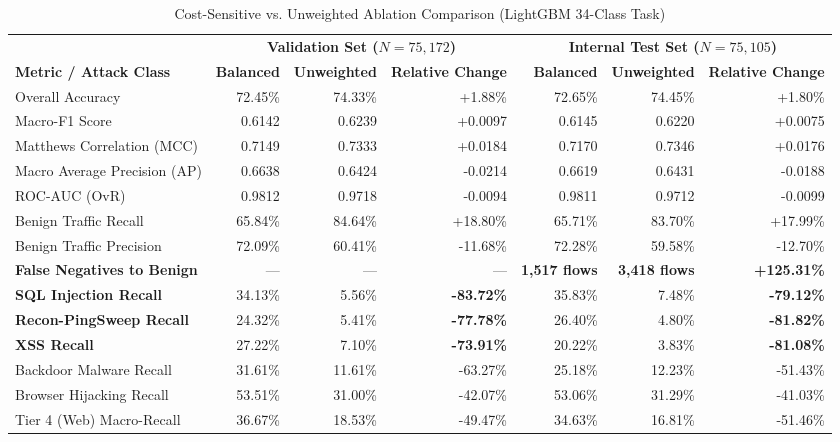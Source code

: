 \documentclass[conference,10pt,twocolumn]{IEEEtran}
\begin{document}
\begin{table}[t]
\centering
\caption{Cost-Sensitive vs. Unweighted Ablation Comparison (LightGBM 34-Class Task)}
\label{tab:cost_sensitive_ablation}
\small
\begin{tabular}{@{}lrrrrrr@{}}
\toprule
& \multicolumn{3}{c}{\textbf{Validation Set ($N = 75,172$)}} & \multicolumn{3}{c}{\textbf{Internal Test Set ($N = 75,105$)}} \\ \cmidrule(lr){2-4} \cmidrule(lr){5-7}
\textbf{Metric / Attack Class} & \textbf{Balanced} & \textbf{Unweighted} & \textbf{Relative Change} & \textbf{Balanced} & \textbf{Unweighted} & \textbf{Relative Change} \\ \midrule
Overall Accuracy & 72.45\% & 74.33\% & +1.88\% & 72.65\% & 74.45\% & +1.80\% \\
Macro-F1 Score & 0.6142 & 0.6239 & +0.0097 & 0.6145 & 0.6220 & +0.0075 \\
Matthews Correlation (MCC) & 0.7149 & 0.7333 & +0.0184 & 0.7170 & 0.7346 & +0.0176 \\
Macro Average Precision (AP) & 0.6638 & 0.6424 & -0.0214 & 0.6619 & 0.6431 & -0.0188 \\
ROC-AUC (OvR) & 0.9812 & 0.9718 & -0.0094 & 0.9811 & 0.9712 & -0.0099 \\ \midrule
Benign Traffic Recall & 65.84\% & 84.64\% & +18.80\% & 65.71\% & 83.70\% & +17.99\% \\
Benign Traffic Precision & 72.09\% & 60.41\% & -11.68\% & 72.28\% & 59.58\% & -12.70\% \\
\textbf{False Negatives to Benign} & --- & --- & --- & \textbf{1,517 flows} & \textbf{3,418 flows} & \textbf{+125.31\%} \\ \midrule
\textbf{SQL Injection Recall} & 34.13\% & 5.56\% & \textbf{-83.72\%} & 35.83\% & 7.48\% & \textbf{-79.12\%} \\
\textbf{Recon-PingSweep Recall} & 24.32\% & 5.41\% & \textbf{-77.78\%} & 26.40\% & 4.80\% & \textbf{-81.82\%} \\
\textbf{XSS Recall} & 27.22\% & 7.10\% & \textbf{-73.91\%} & 20.22\% & 3.83\% & \textbf{-81.08\%} \\
Backdoor Malware Recall & 31.61\% & 11.61\% & -63.27\% & 25.18\% & 12.23\% & -51.43\% \\
Browser Hijacking Recall & 53.51\% & 31.00\% & -42.07\% & 53.06\% & 31.29\% & -41.03\% \\
Tier 4 (Web) Macro-Recall & 36.67\% & 18.53\% & -49.47\% & 34.63\% & 16.81\% & -51.46\% \\ \bottomrule
\end{tabular}
\end{table}
\end{document}
